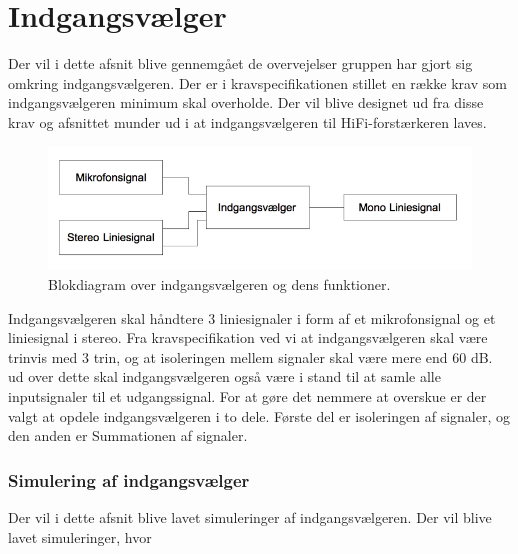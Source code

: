 \chapter{Indgangsvælger}
\label{indgangsvaelger}
Der vil i dette afsnit blive gennemgået de overvejelser gruppen har gjort sig omkring indgangsvælgeren. Der er i kravspecifikationen stillet en række krav som indgangsvælgeren minimum skal overholde. Der vil blive designet ud fra disse krav og afsnittet munder ud i at indgangsvælgeren til HiFi-forstærkeren laves.

\begin{figure}[h]
\centering
\includegraphics[scale=0.6]{teknisk/indgangsvaelger/overordnetdesign.png}
\caption{Blokdiagram over indgangsvælgeren og dens funktioner.}
\label{indgangsvaelger-overordnet}
\end{figure}

Indgangsvælgeren skal håndtere 3 liniesignaler i form af et mikrofonsignal og et liniesignal i stereo. Fra kravspecifikation ved vi at indgangsvælgeren skal være trinvis med 3 trin, og at isoleringen mellem signaler skal være mere end 60 dB. ud over dette skal indgangsvælgeren også være i stand til at samle alle inputsignaler til et udgangssignal. For at gøre det nemmere at overskue er der valgt at opdele indgangsvælgeren i to dele. Første del er isoleringen af signaler, og den anden er Summationen af signaler.


\subsection*{Simulering af indgangsvælger}
Der vil i dette afsnit blive lavet simuleringer af indgangsvælgeren. Der vil blive lavet simuleringer, hvor 


